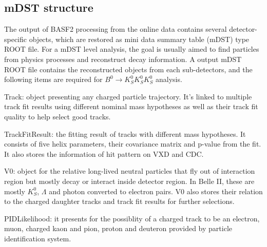 \begin{comment}
In practice, BASF2 starts running when it checks there is at least one module specifying the number of events to be processed in a ``path"  from the ``steering file", then it reads in the information from DataStore in the input ROOT file, execute all the requested modules in the ``steering file" and return the time and number of events as information printed in standard output.
\end{comment}



\subsection{mDST structure}

The output of BASF2 processing from the online data contains several detector-specific objects, which are restored as mini data summary table (mDST) type ROOT file. For a mDST level analysis, the goal is usually aimed to find particles from physics processes and reconstruct decay information. A output mDST ROOT file contains the reconstructed objects from each sub-detectors, and the following items are required for $B^0 \to K_S^0  K_S^0  K_S^0$ analysis. 


\textbullet \space Track: object presenting any charged particle trajectory. It's linked to multiple track fit results using different nominal mass hypotheses as well as their track fit quality to help select good tracks.  

\textbullet \space TrackFitResult: the fitting result of tracks with different mass hypotheses. It consists of five helix parameters, their covariance matrix and p-value from the fit. It also stores the information of hit pattern on VXD and CDC. 

\textbullet \space V0: object for the relative long-lived neutral particles that fly out of interaction region but mostly decay or interact inside detector region. In Belle II, these are mostly $K_S^0$, $\Lambda$ and photon converted to electron pairs. V0 also stores their relation to the charged daughter tracks and track fit results for further selections.


\textbullet \space PIDLikelihood: it presents for the possiblity of a charged track to be an electron, muon, charged kaon and pion, proton and deuteron provided by particle identification system. 

